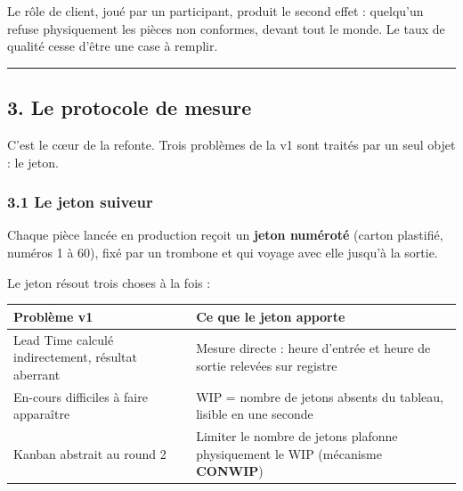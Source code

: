 \documentclass[
]{article}
\newcounter{none} %
\begin{document}
Le rôle de client, joué par un participant, produit le second effet :
quelqu'un refuse physiquement les pièces non conformes, devant tout le
monde. Le taux de qualité cesse d'être une case à remplir.

\begin{center}\rule{0.5\linewidth}{0.5pt}\end{center}

\subsection{3. Le protocole de mesure}\label{le-protocole-de-mesure}

C'est le cœur de la refonte. Trois problèmes de la v1 sont traités par
un seul objet : le jeton.

\subsubsection{3.1 Le jeton suiveur}\label{le-jeton-suiveur}

Chaque pièce lancée en production reçoit un \textbf{jeton numéroté}
(carton plastifié, numéros 1 à 60), fixé par un trombone et qui voyage
avec elle jusqu'à la sortie.

Le jeton résout trois choses à la fois :

{\def\LTcaptype{none} %
\begin{longtable}[]{@{}
  >{\raggedright\arraybackslash}p{}
  >{\raggedright\arraybackslash}p{}@{}}
\toprule\noalign{}
\begin{minipage}[b]{\linewidth}\raggedright
Problème v1
\end{minipage} & \begin{minipage}[b]{\linewidth}\raggedright
Ce que le jeton apporte
\end{minipage} \\
\midrule\noalign{}
\endhead
\bottomrule\noalign{}
\endlastfoot
Lead Time calculé indirectement, résultat aberrant & Mesure directe :
heure d'entrée et heure de sortie relevées sur registre \\
En-cours difficiles à faire apparaître & WIP = nombre de jetons absents
du tableau, lisible en une seconde \\
Kanban abstrait au round 2 & Limiter le nombre de jetons plafonne
physiquement le WIP (mécanisme \textbf{CONWIP}) \\
\end{longtable}
}
\end{document}
